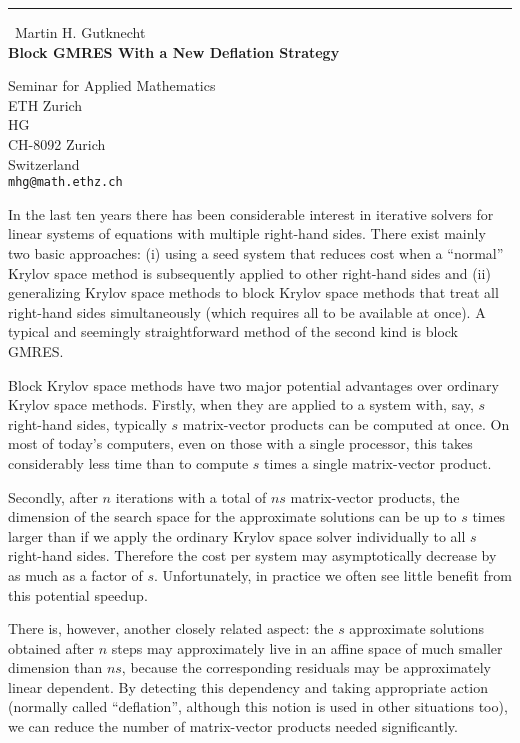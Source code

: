 \documentclass{report}
\begin{document}
\begin{center}
\rule{6in}{1pt} \
{\large Martin H. Gutknecht \\
{\bf Block GMRES With a New Deflation Strategy}}

Seminar for Applied Mathematics \\ ETH Zurich \\ HG \\ CH-8092 Zurich \\ Switzerland
\\
{\tt mhg@math.ethz.ch}\end{center}

In the last ten years there has been considerable interest in
iterative solvers for linear systems of equations with multiple
right-hand sides.
There exist mainly two basic approaches: (i) using a seed system
that reduces cost when a ``normal'' Krylov space method is
subsequently applied to other right-hand sides and (ii) generalizing
Krylov space methods to block Krylov space methods that treat all
right-hand sides simultaneously (which requires all to be
available at once).
A typical and seemingly straightforward method of the second kind is
block GMRES.

Block Krylov space methods have two major potential advantages over
ordinary Krylov space methods. Firstly, when they are applied to a
system with, say, $s$ right-hand sides, typically $s$ matrix-vector
products can be computed at once. On most of today's computers, even
on those with a single processor, this takes considerably less time
than to compute $s$ times a single matrix-vector product.

Secondly, after $n$ iterations with a total of $ns$ matrix-vector
products, the dimension of the search space for the approximate
solutions can be up to $s$ times larger than if we apply the ordinary
Krylov space solver individually to all $s$ right-hand sides.
Therefore the cost per system may asymptotically decrease by as much
as a factor of $s$.
Unfortunately, in practice we often see little benefit from this
potential speedup.

There is, however, another closely related aspect: the $s$ approximate
solutions obtained after $n$ steps may approximately live in an affine
space of much smaller dimension than $ns$, because the corresponding
residuals may be approximately linear dependent.
By detecting this dependency and taking appropriate action (normally
called ``deflation'', although this notion is used in other situations
too), we can reduce the number of matrix-vector products needed
significantly.
\end{document}
